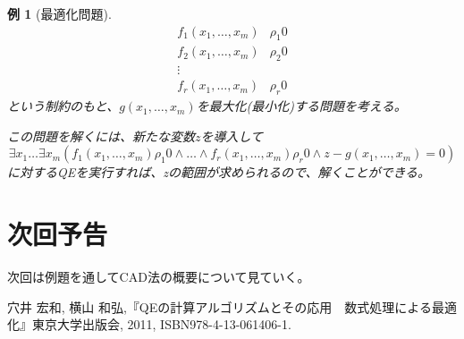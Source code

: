 \documentclass[a4j,12pt]{jarticle}
\theoremstyle{break}
\newtheorem{Example}{例}[section]
\begin{document}
\begin{Example}[最適化問題]
\begin{align*}
f_{1}(x_1, \dots , x_m) &\rho_{1} 0 \\
f_{2}(x_1, \dots , x_m) &\rho_{2} 0 \\
\vdots \\
f_{r}(x_1, \dots , x_m) &\rho_{r} 0
\end{align*}
という制約のもと、$g(x_1, \dots , x_m)$を最大化(最小化)する問題を考える。

この問題を解くには、新たな変数$z$を導入して
\[
\exists x_1 \dots \exists x_m (f_{1}(x_1, \dots , x_m) \rho_{1} 0 \wedge 
\dots \wedge f_{r}(x_1, \dots , x_m) \rho_{r} 0 \wedge z - g(x_1, \dots , x_m) = 0)
\]
に対するQEを実行すれば、zの範囲が求められるので、解くことができる。

\end{Example}

\section{次回予告}
次回は例題を通してCAD法の概要について見ていく。

\begin{thebibliography}{99}
  穴井 宏和, 横山 和弘,『QEの計算アルゴリズムとその応用　数式処理による最適化』東京大学出版会, 2011, ISBN978-4-13-061406-1.
\end{thebibliography}
\end{document}
